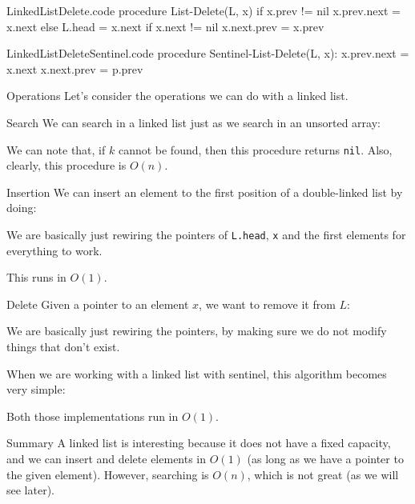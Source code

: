 \documentclass[a4paper]{article}
\begin{document}
\begin{filecontents*}[overwrite]{LinkedListDelete.code}
procedure List-Delete(L, x)
    if x.prev != nil
        x.prev.next = x.next
    else
        L.head = x.next
    if x.next != nil
        x.next.prev = x.prev
\end{filecontents*}

\begin{filecontents*}[overwrite]{LinkedListDeleteSentinel.code}
procedure Sentinel-List-Delete(L, x):
    x.prev.next = x.next
    x.next.prev = p.prev
\end{filecontents*}


\begin{parag}{Operations}
    Let's consider the operations we can do with a linked list.

    \begin{subparag}{Search}
        We can search in a linked list just as we search in an unsorted array:
        
        We can note that, if $k$ cannot be found, then this procedure returns \texttt{nil}. Also, clearly, this procedure is $O\left(n\right)$.
    \end{subparag}

    \begin{subparag}{Insertion}
        We can insert an element to the first position of a double-linked list by doing:
        
        We are basically just rewiring the pointers of \texttt{L.head}, \texttt{x} and the first elements for everything to work.

        This runs in $O\left(1\right)$.
    \end{subparag}
    
    \begin{subparag}{Delete}
        Given a pointer to an element $x$, we want to remove it from $L$:
        
        We are basically just rewiring the pointers, by making sure we do not modify things that don't exist.

        When we are working with a linked list with sentinel, this algorithm becomes very simple:

        Both those implementations run in $O\left(1\right)$.
    \end{subparag}
\end{parag}

\begin{parag}{Summary}
    A linked list is interesting because it does not have a fixed capacity, and we can insert and delete elements in $O\left(1\right)$ (as long as we have a pointer to the given element). However, searching is $O\left(n\right)$, which is not great (as we will see later).
\end{parag}
\end{document}
